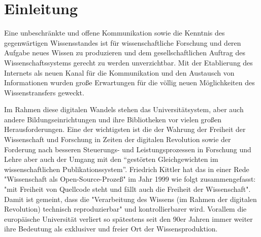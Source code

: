 \chapter{Einleitung} 
Eine unbeschränkte und offene Kommunikation sowie die Kenntnis des gegenwärtigen Wissensstandes ist für wissenschaftliche Forschung und deren Aufgabe neues Wissen zu produzieren und dem gesellschaftlichen Auftrag des Wissenschaftssystems gerecht zu werden unverzichtbar\cite{Hanekop_2014}\cite{glaeser2006}\cite{Luhmann1998}. Mit der Etablierung des Internets als neuen Kanal für die Kommunikation und den Austausch von Informationen wurden große Erwartungen für die völlig neuen Möglichkeiten des Wissenstransfers geweckt\cite{Hanekop_2014}\cite{Lawrence_1999}. 

Im Rahmen diese digitalen Wandels stehen das Universitätsystem, aber auch andere Bildungseinrichtungen und ihre Bibliotheken vor vielen großen Herausforderungen\cite{Harter2006}\cite{Gu_don_2004}. Eine der wichtigsten ist die der Wahrung der Freiheit der Wissenschaft und Forschung in Zeiten der digitalen Revolution sowie der Forderung nach besseren Steuerungs- und Leistungsprozessen in Forschung und Lehre\cite{Adler_2009} aber auch der Umgang mit den “gestörten Gleichgewichten im wissenschaftlichen Publikationssystem”\cite{cite:0}. Friedrich Kittler hat das in einer Rede "Wissenschaft als Open-Source-Prozeß" im Jahr 1999 wie folgt zusammengefasst: "mit Freiheit von Quellcode steht und fällt auch die Freiheit der Wissenschaft". Damit ist gemeint, dass die "Verarbeitung des Wissens (im Rahmen der digitalen Revolution) technisch reproduzierbar"\cite{cite:1} und kontrollierbarer wird. Vorallem die europäische Universität verliert so spätestens seit den 90er Jahren immer weiter ihre Bedeutung als exklusiver und freier Ort der Wissensproduktion.

